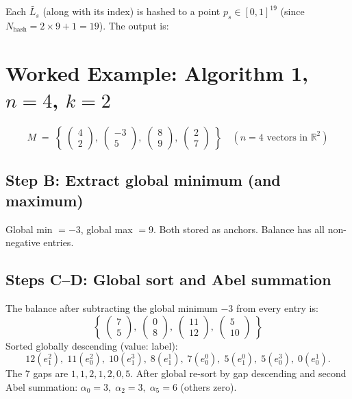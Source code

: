 \documentclass[11pt,a4paper]{article}
\newcommand{\eji}[2]{e^{#1}_{#2}}       %
\newcommand{\canon}[1]{\widetilde{#1}}  %
\newcommand{\R}{\mathbb{R}}
\begin{document}
Each $\canon{L_s}$ (along with its index) is hashed to a point $p_s \in
[0,1]^{19}$ (since $N_{\text{hash}} = 2{\times}9{+}1 = 19$).
The output is:


\section{Worked Example: Algorithm 1, $n=4$, $k=2$}
\label{sec:example-alg1}

\[
  M \;=\; \left\{\;
    \begin{pmatrix}4\\2\end{pmatrix},\;
    \begin{pmatrix}-3\\5\end{pmatrix},\;
    \begin{pmatrix}8\\9\end{pmatrix},\;
    \begin{pmatrix}2\\7\end{pmatrix}
  \;\right\}
  \quad (n=4 \text{ vectors in } \R^2)
\]

\subsection*{Step B: Extract global minimum (and maximum)}

Global min $= -3$, global max $= 9$.  Both stored as anchors.  Balance has
all non-negative entries.

\subsection*{Steps C--D: Global sort and Abel summation}

The balance after subtracting the global minimum $-3$ from every entry is:
\[
  \left\{\;\begin{pmatrix}7\\5\end{pmatrix},\;
            \begin{pmatrix}0\\8\end{pmatrix},\;
            \begin{pmatrix}11\\12\end{pmatrix},\;
            \begin{pmatrix}5\\10\end{pmatrix}\;\right\}
\]
Sorted globally descending (value: label):
\[
  12(\eji{2}{1}),\;11(\eji{2}{0}),\;10(\eji{3}{1}),\;8(\eji{1}{1}),\;
  7(\eji{0}{0}),\;5(\eji{0}{1}),\;5(\eji{3}{0}),\;0(\eji{1}{0}).
\]
The 7 gaps are $1,1,2,1,2,0,5$.  After global re-sort by gap descending and
second Abel summation: $\alpha_0=3,\;\alpha_2=3,\;\alpha_5=6$ (others zero).
\end{document}
